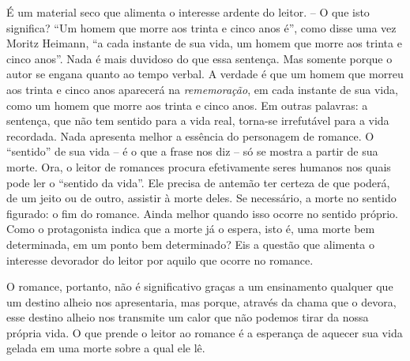 É um material seco que alimenta o interesse ardente do leitor. -- O que
isto significa? ``Um homem que morre aos trinta e cinco anos é'', como
disse uma vez Moritz Heimann, ``a cada instante de sua vida, um homem
que morre aos trinta e cinco anos''. Nada é mais duvidoso do que essa
sentença. Mas somente porque o autor se engana quanto ao tempo verbal. A
verdade é que um homem que morreu aos trinta e cinco anos aparecerá na
\emph{rememoração}, em cada instante de sua vida, como um homem que
morre aos trinta e cinco anos. Em outras palavras: a sentença, que não
tem sentido para a vida real, torna-se irrefutável para a vida
recordada. Nada apresenta melhor a essência do personagem de romance. O
``sentido'' de sua vida -- é o que a frase nos diz -- só se mostra a
partir de sua morte. Ora, o leitor de romances procura efetivamente
seres humanos nos quais pode ler o ``sentido da vida''. Ele precisa de
antemão ter certeza de que poderá, de um jeito ou de outro, assistir à
morte deles. Se necessário, a morte no sentido figurado: o fim do
romance. Ainda melhor quando isso ocorre no sentido próprio. Como o
protagonista indica que a morte já o espera, isto é, uma morte bem
determinada, em um ponto bem determinado? Eis a questão que alimenta o
interesse devorador do leitor por aquilo que ocorre no romance.

O romance, portanto, não é significativo graças a um ensinamento
qualquer que um destino alheio nos apresentaria, mas porque, através da
chama que o devora, esse destino alheio nos transmite um calor que não
podemos tirar da nossa própria vida. O que prende o leitor ao romance é
a esperança de aquecer sua vida gelada em uma morte sobre a qual ele lê.

\section{}

